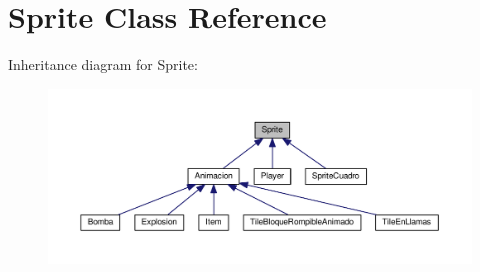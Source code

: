 \hypertarget{class_sprite}{}\section{Sprite Class Reference}
\label{class_sprite}


Inheritance diagram for Sprite\+:
\nopagebreak
\begin{figure}[H]
\begin{center}
\leavevmode
\includegraphics[width=350pt]{class_sprite__inherit__graph}
\end{center}
\end{figure}
